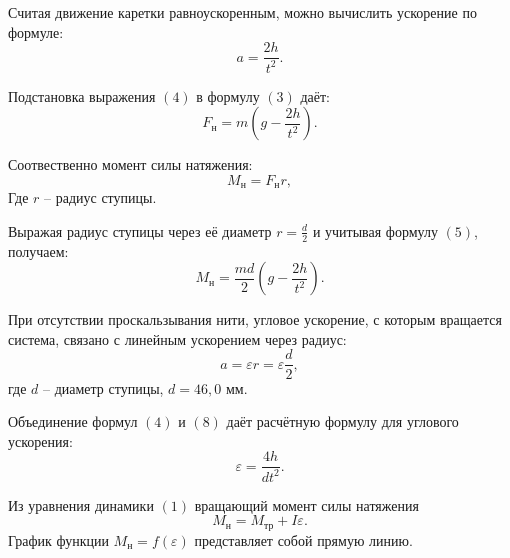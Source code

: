 \documentclass[12pt]{article}
\begin{document}
Считая движение каретки равноускоренным, можно вычислить ускорение по формуле:
\begin{equation}
a = \frac{2h}{t^2}.
\end{equation}

Подстановка выражения $(4)$ в формулу $(3)$ даёт:
\begin{equation}
	F_{н}=m(g-\frac{2h}{t^2 }).	
\end{equation}

Соотвественно момент силы натяжения:
\begin{equation}
	M_{н} = F_{н}r,	
\end{equation}	
Где $r$ – радиус ступицы. 

Выражая радиус ступицы через её диаметр $r=\frac{d}{2}$ и учитывая формулу $(5)$, получаем:
\begin{equation} 
	M_{н}=\frac{md}{2} (g-\frac{2h}{t^2 }).	
\end{equation}

При отсутствии проскальзывания нити, угловое ускорение, с которым вращается система, связано с линейным ускорением через радиус:
	\begin{equation}
	 a=\varepsilon r=\varepsilon \frac{d}{2},
	 \end{equation}
где $d$ – диаметр ступицы, $d = 46,0$ мм.

Объединение формул $(4)$ и $(8)$ даёт расчётную формулу для углового ускорения:
\begin{equation}	
\varepsilon=\frac{4h}{dt^2 }.	
\end{equation}

Из уравнения динамики $(1)$ вращающий момент силы натяжения
\begin{equation}
	M_{н}=M_{тр}+I\varepsilon.
	\end{equation}
 График функции $M_{н}=f(\varepsilon)$ представляет собой прямую линию.
\end{document}
